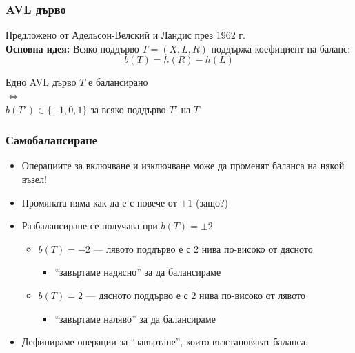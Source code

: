 \documentclass{beamer}
\begin{document}
\begin{frame}
  \frametitle{AVL дърво}
  Предложено от Адельсон-Велский и Ландис през 1962 г.\\[1em]
  \textbf{Основна идея:} Всяко поддърво $T = (X,L,R)$ поддържа коефициент на баланс:
  \begin{equation*}
    b(T) = h(R) - h(L)
  \end{equation*}
  \pause
  \begin{block}{}
    \begin{center}
      Едно AVL дърво $T$ е балансирано\\
      $\Longleftrightarrow$\\
      $b(T') \in \{-1,0,1\}$ за всяко поддърво $T'$ на $T$
    \end{center}
  \end{block}
\end{frame}

\begin{frame}
  \frametitle{Самобалансиране}
  \begin{itemize}[<+->]
  \item Операциите за включване и изключване може да променят баланса на някой възел!
  \item Промяната няма как да е с повече от $\pm 1$ (защо?)
  \item Разбалансиране се получава при $b(T) = \pm 2$
    \begin{itemize}
    \item $b(T) = -2$ --- лявото поддърво е с 2 нива по-високо от дясното
      \begin{itemize}
      \item<7-> ``завъртаме надясно'' за да балансираме
      \end{itemize}
    \item $b(T) = 2$ --- дясното поддърво е с 2 нива по-високо от лявото
      \begin{itemize}
      \item<8-> ``завъртаме наляво'' за да балансираме
      \end{itemize}
    \end{itemize}
  \item
    Дефинираме операции за ``завъртане'', които възстановяват баланса.
  \end{itemize}
\end{frame}
\end{document}
